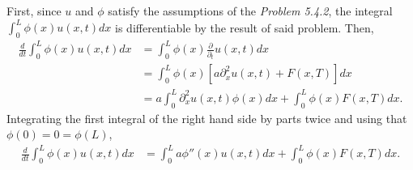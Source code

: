 \begin{questions}
\begin{solution}
First, since $u$ and $\phi$ satisfy the assumptions of the \textsl{Problem 5.4.2}, the integral $\int_0^L\phi(x)u(x,t)dx$ is differentiable by the result of said problem. Then,
\begin{align*}
\frac{d}{dt}\int_0^L\phi(x)u(x,t)dx&=\int_0^L\phi(x)\frac{\partial}{\partial_t}u(x,t)dx\\
&=\int_0^L\phi(x)\left[a\partial^2_xu(x,t)+F(x,T)\right]dx\\
&=a\int_0^L\partial^2_xu(x,t)\phi(x)dx+\int_0^L\phi(x)F(x,T)dx.
\end{align*}
Integrating the first integral of the right hand side by parts twice and using that $\phi(0)=0=\phi(L)$,
\begin{align*}
\frac{d}{dt}\int_0^L\phi(x)u(x,t)dx&=\int_0^La\phi''(x)u(x,t)dx+\int_0^L\phi(x)F(x,T)dx.
\end{align*}

\end{solution}
\end{questions}